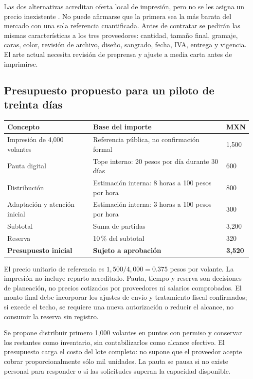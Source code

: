 {Las dos alternativas acreditan oferta local de impresión, pero no se les asigna un precio inexistente \citep{masImprentaMonterrey,creatividadPromocionalVolantes}. No puede afirmarse que la primera sea la más barata del mercado con una sola referencia cuantificada. Antes de contratar se pedirán las mismas características a los tres proveedores: cantidad, tamaño final, gramaje, caras, color, revisión de archivo, diseño, sangrado, fecha, IVA, entrega y vigencia. El arte actual necesita revisión de preprensa y ajuste a media carta antes de imprimirse.

\clearpage
\subsection{Presupuesto propuesto para un piloto de treinta días}

\begin{longtable}{p{.34\linewidth}p{.32\linewidth}p{.18\linewidth}}
\toprule
\textbf{Concepto} & \textbf{Base del importe} & \textbf{MXN}\\
\midrule
Impresión de 4,000 volantes & Referencia pública, no confirmación formal & 1,500\\
Pauta digital & Tope interno: 20 pesos por día durante 30 días & 600\\
Distribución & Estimación interna: 8 horas a 100 pesos por hora & 800\\
Adaptación y atención inicial & Estimación interna: 3 horas a 100 pesos por hora & 300\\
Subtotal & Suma de partidas & 3,200\\
Reserva & 10\,\% del subtotal & 320\\
\textbf{Presupuesto inicial} & \textbf{Sujeto a aprobación} & \textbf{3,520}\\
\bottomrule
\end{longtable}

El precio unitario de referencia es $1{,}500/4{,}000=0.375$ pesos por volante. La impresión no incluye reparto acreditado. Pauta, tiempo y reserva son decisiones de planeación, no precios cotizados por proveedores ni salarios comprobados. El monto final debe incorporar los ajustes de envío y tratamiento fiscal confirmados; si excede el techo, se requiere una nueva autorización o reducir el alcance, no consumir la reserva sin registro.

Se propone distribuir primero 1,000 volantes en puntos con permiso y conservar los restantes como inventario, sin contabilizarlos como alcance efectivo. El presupuesto carga el costo del lote completo: no supone que el proveedor acepte cobrar proporcionalmente sólo mil unidades. La pauta se pausa si no existe personal para responder o si las solicitudes superan la capacidad disponible.

}
